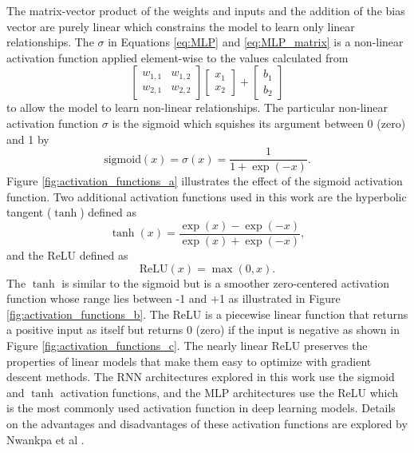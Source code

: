 The matrix-vector product of the weights and inputs and the addition of the bias vector are purely linear which constrains the model to learn only linear relationships. The $\sigma$ in Equations \ref{eq:MLP} and \ref{eq:MLP_matrix} is a non-linear activation function applied element-wise to the values calculated from 
\[
\begin{bmatrix}
	w_{1,1} & w_{1,2} \\
	w_{2,1} & w_{2,2}
\end{bmatrix}
\begin{bmatrix}
	x_{1} \\
	x_{2}
\end{bmatrix}
+
\begin{bmatrix}
	b_{1} \\
	b_{2}
\end{bmatrix}
\]
to allow the model to learn non-linear relationships. The particular non-linear activation function $\sigma$ is the sigmoid which squishes its argument between 0 (zero) and 1 by
\begin{equation} \label{eq:sigmoid}
	\text{sigmoid}\left(x\right) = \sigma \left(x\right) = \frac{1}{1 + \exp \left(-x\right)}.
\end{equation}
Figure \ref{fig:activation_functions_a} \cite{PyTorch} illustrates the effect of the sigmoid activation function. Two additional activation functions used in this work are the hyperbolic tangent ($\tanh$) defined as
\begin{equation} \label{eq:tanh}
	\tanh \left(x\right) = \frac{\exp \left(x\right) - \exp \left(-x\right)}{\exp \left(x\right) + \exp \left(-x\right)},
\end{equation}
and the \ac{ReLU} defined as
\begin{equation} \label{eq:relu}
	\text{ReLU} \left(x\right) = \max \left(0, x\right).
\end{equation}
The $\tanh$ is similar to the sigmoid but is a smoother zero-centered activation function whose range lies between -1 and +1 as illustrated in Figure \ref{fig:activation_functions_b}. The \ac{ReLU} is a piecewise linear function that returns a positive input as itself but returns 0 (zero) if the input is negative as shown in Figure \ref{fig:activation_functions_c}. The nearly linear \ac{ReLU} preserves the properties of linear models that make them easy to optimize with gradient descent methods. The \ac{RNN} architectures explored in this work use the sigmoid and $\tanh$ activation functions, and the \ac{MLP} architectures use the ReLU which is the most commonly used activation function in deep learning models. Details on the advantages and disadvantages of these activation functions are explored by Nwankpa et al \cite{activationfunctions}.
